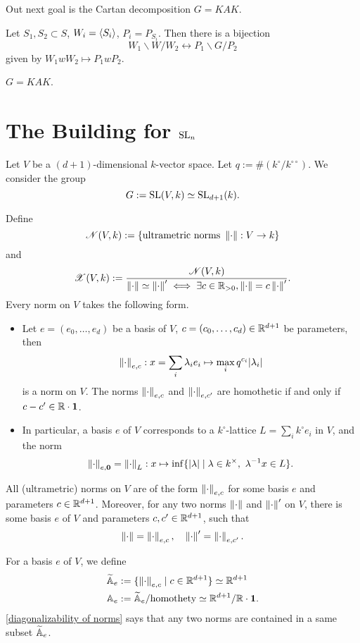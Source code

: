 \documentclass{article}
\newcommand{\bico}[3]{{#2}\backslash {#1}\slash {#3}}
\begin{document}
Out next goal is the Cartan decomposition $G = K\!AK$.

\begin{theorem}\label{correspondence between double cosets of G and W}
    Let $S_1, S_2\subset S$, $W_i = \left\langle S_i \right\rangle$, $P_i = P_{S_i}$.
    Then there is a bijection \[\bico{W}{W_1}{W_2}\leftrightarrow\bico{G}{P_1}{P_2} \]
    given by $W_1wW_2\mapsto P_1wP_2$.
\end{theorem}

\begin{theorem}\label{Cartan decomposition}
    $G = K\!AK$.
\end{theorem}

\section{The Building for \texorpdfstring{$\operatorname{SL}_n$}{PDFstring}}
Let $V$ be a $(d + 1)$-dimensional $k$-vector space.
Let $q := \# (k^\circ/k^{\circ\circ})$.
We consider the group \[G := \operatorname{SL}(V, k)\simeq\operatorname{SL}_{d+1}(k).\]

Define \[\mathscr{N}(V, k) := \{\text{ultrametric norms } \left\| \cdot\right\| : V\to k\}\]
and \[\mathscr{X}(V, k) := \frac{\mathscr{N}(V, k)}{\left\| \cdot\right\|\simeq\left\| \cdot\right\|'\iff \exists c\in\mathbb{R}_{>0}, \left\| \cdot\right\| = c\left\| \cdot\right\|'}.\]
Every norm on $V$ takes the following form.
\begin{itemize}
    \item Let $e = (e_0, \dots, e_d)$ be a basis of $V$, $c = (c_0, \dots, c_d)\in\mathbb{R}^{d+1}$ be parameters,
    then \[\left\| \cdot\right\|_{e, c} : x = \sum_{i}\lambda_ie_i\mapsto\max_i q^{c_i}|\lambda_i| \]
    is a norm on $V$.
    The norms $\left\| \cdot\right\|_{e, c}$ and $\left\| \cdot\right\|_{e, c'}$ are homothetic if and only if $c - c'\in\mathbb{R}\cdot\mathbf{1}$.
    \item In particular, a basis $e$ of $V$ corresponds to a $k^\circ$-lattice $L = \sum_{i} k^\circ e_i$ in $V$,
    and the norm \[\norm{\cdot}_{e, \mathbf{0}} = \norm{\cdot}_{L} : x\mapsto \inf\{|\lambda| \mid \lambda\in k^\times,\ \lambda^{-1}x\in L\}.\]
\end{itemize}
\begin{proposition}\label{diagonalizability of norms}
    All (ultrametric) norms on $V$ are of the form $\left\| \cdot\right\|_{e, c}$ for some basis $e$ and parameters $c\in\mathbb{R}^{d+1}$.
    Moreover, for any two norms $\left\| \cdot\right\|$ and $\left\| \cdot\right\|'$ on $V$,
    there is some basis $e$ of $V$ and parameters $c, c'\in\mathbb{R}^{d+1}$,
    such that \[\left\| \cdot\right\| = \left\| \cdot\right\|_{e, c},\quad \left\| \cdot\right\|' = \left\| \cdot\right\|_{e, c'}.\]
\end{proposition}
For a basis $e$ of $V$,
we define \begin{align*}
    \widetilde{\mathbb{A}}_e &:= \{\left\| \cdot\right\|_{e, c}\mid c\in\mathbb{R}^{d+1}\}\simeq \mathbb{R}^{d+1}\\
    \mathbb{A}_e &:= \widetilde{\mathbb{A}}_e/\text{homothety} \simeq \mathbb{R}^{d+1}/\mathbb{R}\cdot\mathbf{1}.
\end{align*}
\cref{diagonalizability of norms} says that any two norms are contained in a same subset $\widetilde{\mathbb{A}}_e$.
\end{document}
